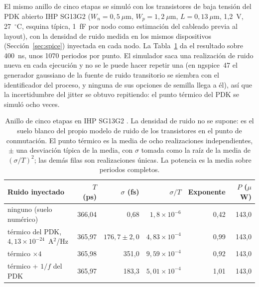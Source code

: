 El mismo anillo de cinco etapas se simuló con los transistores de baja
tensión del \ac{PDK} abierto IHP SG13G2 ($W_n = 0{,}5~\mu$m,
$W_p = 1{,}2~\mu$m, $L = 0{,}13~\mu$m, 1,2~V, 27~$^\circ$C, esquina
típica, 1~fF por nodo como estimación del cableado previa al layout), con
la densidad de ruido medida en los mismos dispositivos
(Sección~\ref{sec:spice}) inyectada en cada nodo. La
Tabla~\ref{tab:ihp_ring} da el resultado sobre 400~ns, unos 1070
periodos por punto. El simulador saca una realización de ruido nueva en
cada ejecución y no se le puede hacer repetir una (en ngspice~47 el
generador gaussiano de la fuente de ruido transitorio se siembra con el
identificador del proceso, y ninguna de sus opciones de semilla llega a
él), así que la incertidumbre del jitter se obtuvo repitiendo: el punto
térmico del \ac{PDK} se simuló ocho veces.

\begin{table}[htbp]
\centering
\caption{Anillo de cinco etapas en IHP SG13G2 \simu{}. La densidad de ruido
no se supone: es el suelo blanco del propio modelo de ruido de los
transistores en el punto de conmutación. El punto térmico es la media de
ocho realizaciones independientes, $\pm$ una desviación típica de la
media, con $\sigma$ tomada como la raíz de la media de $(\sigma/T)^2$;
las demás filas son realizaciones únicas. La potencia es la media
sobre periodos completos.}
\label{tab:ihp_ring}
\small
\setlength{\tabcolsep}{4pt}
\begin{tabular}{@{}lrrrrr@{}}
\toprule
Ruido inyectado & $T$ (ps) & $\sigma$ (fs) & $\sigma/T$ & Exponente & $P$ ($\mu$W) \\
\midrule
ninguno (suelo numérico)        & 366,04 & 0,68   & $1{,}8\times10^{-6}$ & 0,42 & 143,0 \\
térmico del \ac{PDK}, $4{,}13\times10^{-24}$~A$^2$/Hz & 365,97 & $176{,}7 \pm 2{,}0$ & $4{,}83\times10^{-4}$ & 0,99 & 143,0 \\
térmico $\times4$               & 365,98 & 351,0  & $9{,}59\times10^{-4}$ & 0,92 & 143,0 \\
térmico + $1/f$ del \ac{PDK}    & 365,97 & 183,3  & $5{,}01\times10^{-4}$ & 1,01 & 143,0 \\
\bottomrule
\end{tabular}
\end{table}

